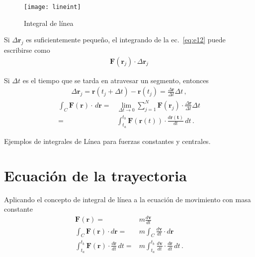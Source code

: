 \begin{frame}
\begin{figure}
  \centering
  \texttt{[image: lineint]}
  \caption{Integral de línea}
  \label{fig:lineint}
\end{figure}
\end{frame}

Si $\Delta \mathbf{r}_j$ es suficientemente pequeño, el integrando de la ec.~\eqref{eq:e12} puede escribirse como
\begin{align}
  \label{eq:dW}
  \mathbf{F}(\mathbf{r}_j)\cdot\Delta\mathbf{r}_j
\end{align}

Si $\Delta t$ es el tiempo que se tarda en atravesar un segmento, entonces
\begin{align}
  \Delta\mathbf{r}_j = \mathbf{r}(t_j+\Delta t)-\mathbf{r}(t_j)=\frac{\Delta\mathbf{r}}{\Delta t}\Delta t\,,
\end{align}
\begin{align}
  \int_C \mathbf{F}(\mathbf{r})\cdot\,d\mathbf{r}=&\lim_{\Delta t\to 0}\sum_{j=1}^N\mathbf{F}(\mathbf{r}_j)\cdot\frac{\Delta\mathbf{r}}{\Delta t}\Delta t\nonumber\\
=&\int_{t_a}^{t_b}\mathbf{F}(\mathbf{r}(t))\cdot\frac{d\mathbf{r(t)}}{dt}\,dt\,.
\end{align}
\begin{inprogress}
  Ejemplos de integrales de Línea para fuerzas constantes y centrales.
\end{inprogress}


\section{Ecuación de la trayectoria}

Aplicando el concepto de integral de línea a la ecuación de movimiento con masa constante
\begin{align}
\label{eq:trayectoria}
  \mathbf{F}(\mathbf{r})=&m\frac{d\mathbf{v}}{dt}\nonumber\\
  \int_C\mathbf{F}(\mathbf{r})\cdot d\mathbf{r}=&m\int_C\frac{d\mathbf{v}}{dt}\cdot d\mathbf{r}\nonumber\\
 \int_{t_a}^{t_b}\mathbf{F}(\mathbf{r})\cdot \frac{d\mathbf{r}}{dt}\,dt=&m\int_{t_a}^{t_b}\frac{d\mathbf{v}}{dt}\cdot \frac{d\mathbf{r}}{dt}\,dt\,.
\end{align}


